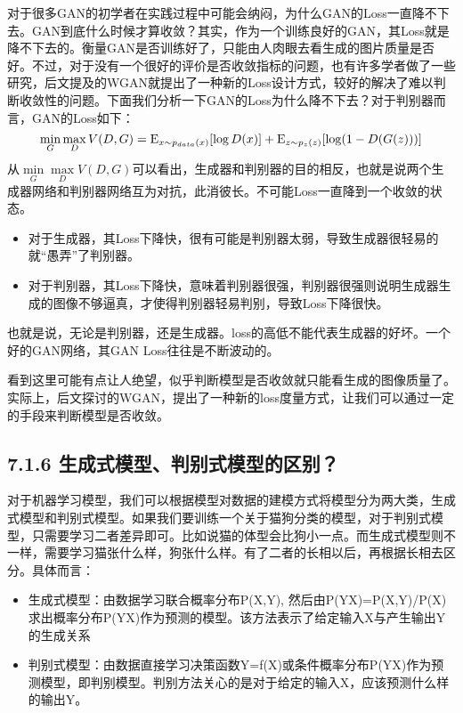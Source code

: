 ​
对于很多GAN的初学者在实践过程中可能会纳闷，为什么GAN的Loss一直降不下去。GAN到底什么时候才算收敛？其实，作为一个训练良好的GAN，其Loss就是降不下去的。衡量GAN是否训练好了，只能由人肉眼去看生成的图片质量是否好。不过，对于没有一个很好的评价是否收敛指标的问题，也有许多学者做了一些研究，后文提及的WGAN就提出了一种新的Loss设计方式，较好的解决了难以判断收敛性的问题。下面我们分析一下GAN的Loss为什么降不下去？
​ 对于判别器而言，GAN的Loss如下： \[
\mathop {\min }\limits_G \mathop {\max }\limits_D V(D,G) = {\rm E}_{x\sim{p_{data}(x)}}[\log D(x)] + {\rm E}_{z\sim{p_z}(z)}[\log (1 - D(G(z)))]
\] ​
从\(\mathop {\min }\limits_G \mathop {\max }\limits_D V(D,G)​\)可以看出，生成器和判别器的目的相反，也就是说两个生成器网络和判别器网络互为对抗，此消彼长。不可能Loss一直降到一个收敛的状态。

\begin{itemize}
\item
  对于生成器，其Loss下降快，很有可能是判别器太弱，导致生成器很轻易的就``愚弄''了判别器。
\item
  对于判别器，其Loss下降快，意味着判别器很强，判别器很强则说明生成器生成的图像不够逼真，才使得判别器轻易判别，导致Loss下降很快。
\end{itemize}

​
也就是说，无论是判别器，还是生成器。loss的高低不能代表生成器的好坏。一个好的GAN网络，其GAN
Loss往往是不断波动的。

​
看到这里可能有点让人绝望，似乎判断模型是否收敛就只能看生成的图像质量了。实际上，后文探讨的WGAN，提出了一种新的loss度量方式，让我们可以通过一定的手段来判断模型是否收敛。

\subsection{7.1.6
生成式模型、判别式模型的区别？}\label{ux751fux6210ux5f0fux6a21ux578bux5224ux522bux5f0fux6a21ux578bux7684ux533aux522b}

​
对于机器学习模型，我们可以根据模型对数据的建模方式将模型分为两大类，生成式模型和判别式模型。如果我们要训练一个关于猫狗分类的模型，对于判别式模型，只需要学习二者差异即可。比如说猫的体型会比狗小一点。而生成式模型则不一样，需要学习猫张什么样，狗张什么样。有了二者的长相以后，再根据长相去区分。具体而言：

\begin{itemize}
\item
  生成式模型：由数据学习联合概率分布P(X,Y),
  然后由P(Y\textbar{}X)=P(X,Y)/P(X)求出概率分布P(Y\textbar{}X)作为预测的模型。该方法表示了给定输入X与产生输出Y的生成关系
\item
  判别式模型：由数据直接学习决策函数Y=f(X)或条件概率分布P(Y\textbar{}X)作为预测模型，即判别模型。判别方法关心的是对于给定的输入X，应该预测什么样的输出Y。
\end{itemize}

